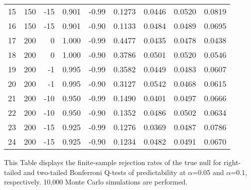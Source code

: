 \documentclass{article}
\begin{document}
\begin{table}[h!]
\begin{threeparttable}
\begin{tabular}{rrrrrrrrr}
  15 & 150 & -15 & 0.901 & -0.99 & 0.1273 & 0.0446 & 0.0520 & 0.0819 \\ 
  16 & 150 & -15 & 0.901 & -0.90 & 0.1133 & 0.0484 & 0.0489 & 0.0695 \\ 
  17 & 200 & 0 & 1.000 & -0.99 & 0.4477 & 0.0435 & 0.0478 & 0.0438 \\ 
  18 & 200 & 0 & 1.000 & -0.90 & 0.3786 & 0.0501 & 0.0520 & 0.0546 \\ 
  19 & 200 & -1 & 0.995 & -0.99 & 0.3582 & 0.0449 & 0.0483 & 0.0607 \\ 
  20 & 200 & -1 & 0.995 & -0.90 & 0.3127 & 0.0542 & 0.0468 & 0.0615 \\ 
  21 & 200 & -10 & 0.950 & -0.99 & 0.1490 & 0.0401 & 0.0497 & 0.0666 \\ 
  22 & 200 & -10 & 0.950 & -0.90 & 0.1352 & 0.0486 & 0.0502 & 0.0634 \\ 
  23 & 200 & -15 & 0.925 & -0.99 & 0.1276 & 0.0369 & 0.0487 & 0.0786 \\ 
  24 & 200 & -15 & 0.925 & -0.90 & 0.1234 & 0.0482 & 0.0491 & 0.0670 \\ 
   \hline
\end{tabular}
 \begin{tablenotes}
 \small
\item This Table displays the finite-sample rejection rates of the true null for right-tailed and two-tailed Bonferroni Q-tests of predictability at $\alpha$=0.05 and $\alpha$=0.1, respectively. 10,000 Monte Carlo simulations are performed.
\end{tablenotes}
\end{threeparttable}
\end{table}
\end{document}
